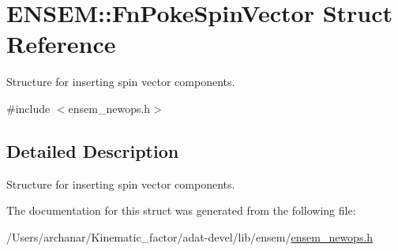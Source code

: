 \hypertarget{structENSEM_1_1FnPokeSpinVector}{}\section{E\+N\+S\+EM\+:\+:Fn\+Poke\+Spin\+Vector Struct Reference}
\label{structENSEM_1_1FnPokeSpinVector}


Structure for inserting spin vector components.  




{\ttfamily \#include $<$ensem\+\_\+newops.\+h$>$}



\subsection{Detailed Description}
Structure for inserting spin vector components. 

The documentation for this struct was generated from the following file\+:\begin{DoxyCompactItemize}
\item 
/\+Users/archanar/\+Kinematic\+\_\+factor/adat-\/devel/lib/ensem/\mbox{\hyperlink{adat-devel_2lib_2ensem_2ensem__newops_8h}{ensem\+\_\+newops.\+h}}\end{DoxyCompactItemize}

